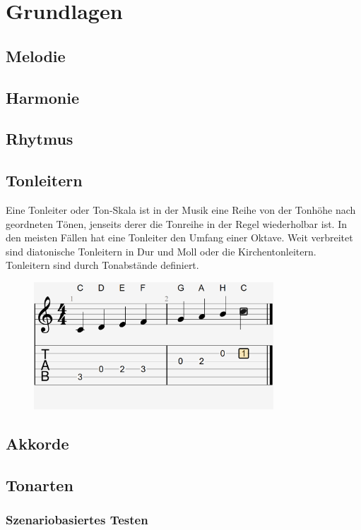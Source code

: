 \section{Grundlagen}
\subsection{Melodie}
\subsection{Harmonie}
\subsection{Rhytmus}

\subsection{Tonleitern}
Eine Tonleiter oder Ton-Skala ist in der Musik eine Reihe von der Tonhöhe nach geordneten Tönen, 
jenseits derer die Tonreihe in der Regel wiederholbar ist. In den meisten Fällen hat eine Tonleiter 
den Umfang einer Oktave. Weit verbreitet sind diatonische Tonleitern in Dur und Moll oder die 
Kirchentonleitern. Tonleitern sind durch Tonabstände definiert.

\begin{figure}[htbp]
    \centering
    \includegraphics[width=0.8\textwidth]{images/C_Dur_Tonika}
\end{figure}

\subsection{Akkorde}
\subsection{Tonarten}
\subsubsection{Szenariobasiertes Testen}

